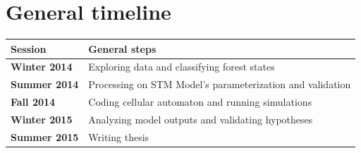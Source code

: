 \section{General timeline}
\vspace{-0.5em}
\begin{table}[h]
\centering
\begin{tabular}{|l|l|}
\hline
\textbf{Session} & \textbf{General steps}                                    \\ \hline
\textbf{Winter 2014}      & Exploring data and classifying forest states              \\
\textbf{Summer 2014}      & Processing on STM Model's parameterization and validation \\
\textbf{Fall 2014}        & Coding cellular automaton and running simulations         \\
\textbf{Winter 2015}      & Analyzing model outputs and validating hypotheses      \\
\textbf{Summer 2015}      & Writing thesis                                            \\ \hline
\end{tabular}
\end{table}

\clearpage


